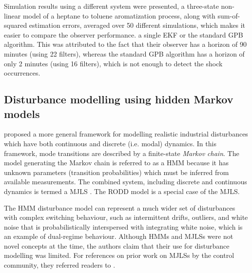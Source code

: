 Simulation results using a different system were presented, a three-state non-linear model of a heptane to toluene aromatization process, along with sum-of-squared estimation errors, averaged over 50 different simulations, which makes it easier to compare the observer performance.  a single \gls{EKF} or the standard \gls{GPB} algorithm. This was attributed to the fact that their observer has a horizon of 90 minutes (using 22 filters), whereas the standard \gls{GPB} algorithm has a horizon of only 2 minutes (using 16 filters), which is not enough to detect the shock occurrences.

\subsection{Disturbance modelling using hidden Markov models} \label{sec:lit-hmm}
\label{hidden_markov_models}

\cite{wong_disturbance_2007} proposed a more general framework for modelling realistic industrial disturbances which have both continuous and discrete (i.e. modal) dynamics. In this framework, mode transitions are described by a finite-state \textit{Markov chain}. The model generating the Markov chain is referred to as a \gls{HMM} because it has unknown parameters (transition probabilities) which must be inferred from available measurements. The combined system, including discrete and continuous dynamics is termed a \gls{MJLS} \citep{costa_discrete-time_2005}. The \gls{RODD} model is a special case of the \gls{MJLS}.


The \gls{HMM} disturbance model can represent a much wider set of disturbances with complex switching behaviour, such as intermittent drifts, outliers, and white noise that is probabilistically interspersed with integrating white noise, which is an example of dual-regime behaviour. Although \gls{HMM}s and \gls{MJLS}s were not novel concepts at the time, the authors claim that their use for disturbance modelling was limited. For references on prior work on \gls{MJLS}s by the control community, they referred readers to \cite{costa_discrete-time_2005}.

